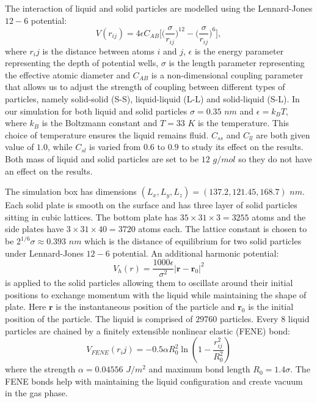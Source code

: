 \documentclass[
reprint,
 amsmath,amssymb,
 aps,
url
]{revtex4-1}
\begin{document}
The interaction of liquid and solid particles are modelled using the Lennard-Jones $12-6$ potential:
\begin{equation}
	V(r_{ij}) = 4\epsilon C_{AB}\bigg[\big(\frac{\sigma}{r_{ij}}\big)^{12} - \big(\frac{\sigma}{r_{ij}}\big)^6\bigg],
\end{equation}
where $r_ij$ is the distance between atoms $i$ and $j$, $\epsilon$ is the energy parameter representing the depth of potential wells, $\sigma$ is the length parameter representing the effective atomic diameter and $C_{AB}$ is a non-dimensional coupling parameter that allows us to adjust the strength of coupling between different types of particles, namely solid-solid (S-S), liquid-liquid (L-L) and solid-liquid (S-L). In our simulation for both liquid and solid particles $\sigma = 0.35$ $nm$ and $\epsilon = k_B T$, where $k_B$ is the Boltzmann constant and $T=33$ $K$ is the temperature. This choice of temperature ensures the liquid remains fluid. $C_{ss}$ and $C_{ll}$ are both given value of $1.0$, while $C_{sl}$ is varied from $0.6$ to $0.9$ to study its effect on the results. Both mass of liquid and solid particles are set to be $12$ $g/mol$ so they do not have an effect on the results.

The simulation box has dimensions $(L_x,L_y,L_z) = (137.2,121.45,168.7)$ $nm$. Each solid plate is smooth on the surface and has three layer of solid particles sitting in cubic lattices. The bottom plate has $35\times 31\times 3=3255$ atoms and the side plates have $3\times 31 \times 40=3720$ atoms each. The lattice constant is chosen to be $2^{1/6} \sigma\approx 0.393$ $nm$ which is the distance of equilibrium for two solid particles under Lennard-Jones $12-6$ potential. An additional harmonic potential:
\begin{equation}
	V_h(r) = \frac{1000\epsilon}{\sigma^2}|\mathbf{r}-\mathbf{r}_0|^2
\end{equation} 
is applied to the solid particles allowing them to oscillate around their initial positions to exchange momentum with the liquid while maintaining the shape of plate. Here $\mathbf{r}$ is the instantaneous position of the particle and $\mathbf{r}_0$ is the initial position of the particle. The liquid is comprised of $29760$ particles. Every $8$ liquid particles are chained by a finitely extensible nonlinear elastic (FENE) bond:
\begin{equation}
	V_{\textit{FENE}}(r_ij) = -0.5\alpha R_0^2 \ln(1-\frac{r_{ij}^2}{R_0^2})
\end{equation}
where the strength $\alpha = 0.04556$ $J/m^2$ and maximum bond length $R_0 = 1.4\sigma$\cite{fernandez-toledano_contact-line_2019}. The FENE bonds help with maintaining the liquid configuration and create vacuum in the gas phase.
\end{document}
